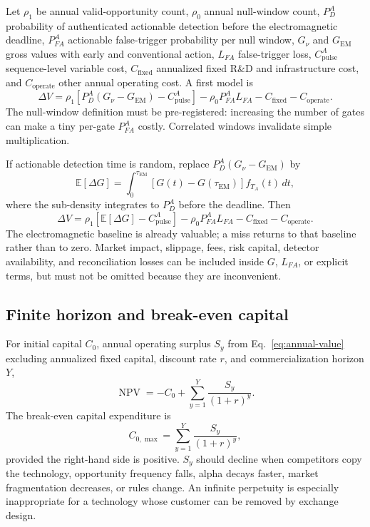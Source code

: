 \documentclass[11pt]{article}
\begin{document}
Let $\rho_1$ be annual valid-opportunity count, $\rho_0$ annual null-window count, $P_D^{A}$ probability of authenticated actionable detection before the electromagnetic deadline, $P_{FA}^{A}$ actionable false-trigger probability per null window, $G_\nu$ and $G_{\mathrm{EM}}$ gross values with early and conventional action, $L_{FA}$ false-trigger loss, $C_{\mathrm{pulse}}^{A}$ sequence-level variable cost, $C_{\mathrm{fixed}}$ annualized fixed R\&D and infrastructure cost, and $C_{\mathrm{operate}}$ other annual operating cost. A first model is
\begin{equation}
\Delta V=\rho_1\left[P_D^{A}(G_\nu-G_{\mathrm{EM}})-C_{\mathrm{pulse}}^{A}\right]
-\rho_0P_{FA}^{A}L_{FA}-C_{\mathrm{fixed}}-C_{\mathrm{operate}}.
\label{eq:annual-simple}
\end{equation}
The null-window definition must be pre-registered: increasing the number of gates can make a tiny per-gate $P_{FA}^{A}$ costly. Correlated windows invalidate simple multiplication.

If actionable detection time is random, replace $P_D^{A}(G_\nu-G_{\mathrm{EM}})$ by
\begin{equation}
\mathbb{E}[\Delta G]=\int_0^{\tau_{\mathrm{EM}}}
\left[G(t)-G(\tau_{\mathrm{EM}})\right]f_{T_A}(t)\,dt,
\label{eq:integrated-gain}
\end{equation}
where the sub-density integrates to $P_D^{A}$ before the deadline. Then
\begin{equation}
\Delta V=\rho_1\left[\mathbb{E}[\Delta G]-C_{\mathrm{pulse}}^{A}\right]
-\rho_0P_{FA}^{A}L_{FA}-C_{\mathrm{fixed}}-C_{\mathrm{operate}}.
\label{eq:annual-value}
\end{equation}
The electromagnetic baseline is already valuable; a miss returns to that baseline rather than to zero. Market impact, slippage, fees, risk capital, detector availability, and reconciliation losses can be included inside $G$, $L_{FA}$, or explicit terms, but must not be omitted because they are inconvenient.

\subsection{Finite horizon and break-even capital}

For initial capital $C_0$, annual operating surplus $S_y$ from Eq.~\eqref{eq:annual-value} excluding annualized fixed capital, discount rate $r$, and commercialization horizon $Y$,
\begin{equation}
\operatorname{NPV}=-C_0+\sum_{y=1}^{Y}\frac{S_y}{(1+r)^y}.
\end{equation}
The break-even capital expenditure is
\begin{equation}
C_{0,\max}=\sum_{y=1}^{Y}\frac{S_y}{(1+r)^y},
\label{eq:capex}
\end{equation}
provided the right-hand side is positive. $S_y$ should decline when competitors copy the technology, opportunity frequency falls, alpha decays faster, market fragmentation decreases, or rules change. An infinite perpetuity is especially inappropriate for a technology whose customer can be removed by exchange design.
\end{document}
